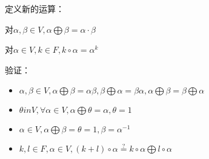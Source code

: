 定义新的运算：
\begin{definition}[$\bigoplus$]
    对$\alpha, \beta \in V, \alpha \bigoplus \beta = \alpha \cdot \beta$
\end{definition}

\begin{definition}[$\circ$]
    对$\alpha \in V, k \in F, k \circ \alpha = \alpha^k$
\end{definition}

验证：
\begin{itemize}
    \item[\circled{1}] $\alpha, \beta \in V, \alpha \bigoplus \beta = \alpha \beta, \beta \bigoplus \alpha = \beta \alpha, \alpha \bigoplus \beta = \beta \bigoplus \alpha$
    \item[\circled{3}] $\theta in V, \forall \alpha \in V, \alpha \bigoplus \theta = \alpha, \theta = 1$
    \item[\circled{4}] $\alpha \in V, \alpha \bigoplus \beta = \theta = 1, \beta = \alpha^{-1}$
    \item[\circled{7}] $k, l \in F, \alpha \in V, (k + l) \circ \alpha \overset{?}{=} k \circ \alpha \bigoplus l \circ \alpha$   
\end{itemize}

